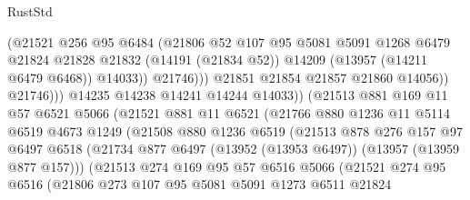 \begin{lexlean}{RustStd}
\begin{coremodule}
                                (@21521
                                  @256
                                  @95
                                  @6484
                                  (@21806
                                    @52
                                    @107
                                    @95
                                    @5081
                                    @5091
                                    @1268
                                    @6479
                                    @21824
                                    @21828
                                    @21832
                                    (@14191 (@21834 @52))
                                    @14209
                                    (@13957 (@14211 @6479 @6468))
                                    @14033))
                                @21746)))
                          @21851
                          @21854
                          @21857
                          @21860
                          @14056))
                      @21746)))
                @14235
                @14238
                @14241
                @14244
                @14033))
            (@21513
              @881
              @169
              @11
              @57
              @6521
              @5066
              (@21521
                @881
                @11
                @6521
                (@21766
                  @880
                  @1236
                  @11
                  @5114
                  @6519
                  @4673
                  @1249
                  (@21508
                    @880
                    @1236
                    @6519
                    (@21513
                      @878
                      @276
                      @157
                      @97
                      @6497
                      @6518
                      (@21734 @877 @6497 (@13952 (@13953 @6497)) (@13957 (@13959 @877 @157)))
                      (@21513
                        @274
                        @169
                        @95
                        @57
                        @6516
                        @5066
                        (@21521
                          @274
                          @95
                          @6516
                          (@21806
                            @273
                            @107
                            @95
                            @5081
                            @5091
                            @1273
                            @6511
                            @21824

\end{coremodule}
\end{lexlean}
